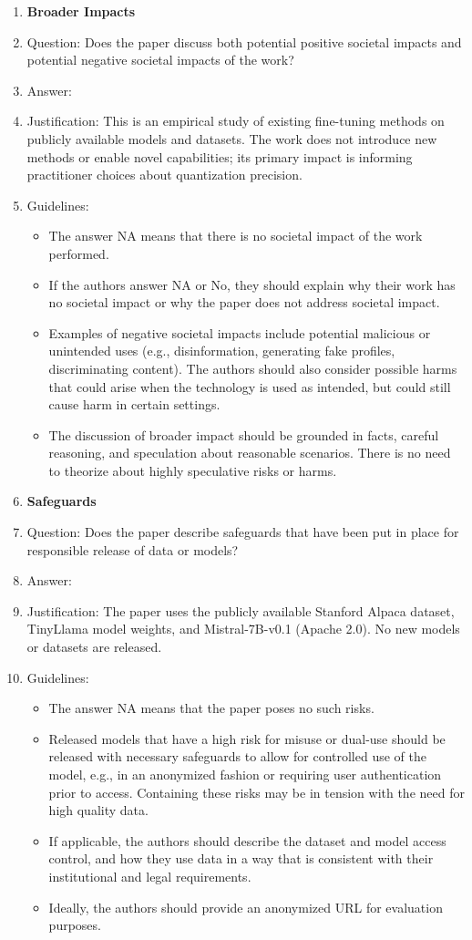 \documentclass{article}
\begin{document}
\begin{enumerate}
\item {\bf Broader Impacts}
\item[] Question: Does the paper discuss both potential positive societal impacts and potential negative societal impacts of the work?
\item[] Answer: \answerNA{}
\item[] Justification: This is an empirical study of existing fine-tuning methods on publicly available models and datasets. The work does not introduce new methods or enable novel capabilities; its primary impact is informing practitioner choices about quantization precision.
\item[] Guidelines:
\begin{itemize}
    \item The answer NA means that there is no societal impact of the work performed.
    \item If the authors answer NA or No, they should explain why their work has no societal impact or why the paper does not address societal impact.
    \item Examples of negative societal impacts include potential malicious or unintended uses (e.g., disinformation, generating fake profiles, discriminating content). The authors should also consider possible harms that could arise when the technology is used as intended, but could still cause harm in certain settings.
    \item The discussion of broader impact should be grounded in facts, careful reasoning, and speculation about reasonable scenarios. There is no need to theorize about highly speculative risks or harms.
\end{itemize}

\item {\bf Safeguards}
\item[] Question: Does the paper describe safeguards that have been put in place for responsible release of data or models?
\item[] Answer: \answerNA{}
\item[] Justification: The paper uses the publicly available Stanford Alpaca dataset, TinyLlama model weights, and Mistral-7B-v0.1 (Apache 2.0). No new models or datasets are released.
\item[] Guidelines:
\begin{itemize}
    \item The answer NA means that the paper poses no such risks.
    \item Released models that have a high risk for misuse or dual-use should be released with necessary safeguards to allow for controlled use of the model, e.g., in an anonymized fashion or requiring user authentication prior to access. Containing these risks may be in tension with the need for high quality data.
    \item If applicable, the authors should describe the dataset and model access control, and how they use data in a way that is consistent with their institutional and legal requirements.
    \item Ideally, the authors should provide an anonymized URL for evaluation purposes.
\end{itemize}


\end{enumerate}
\end{document}
